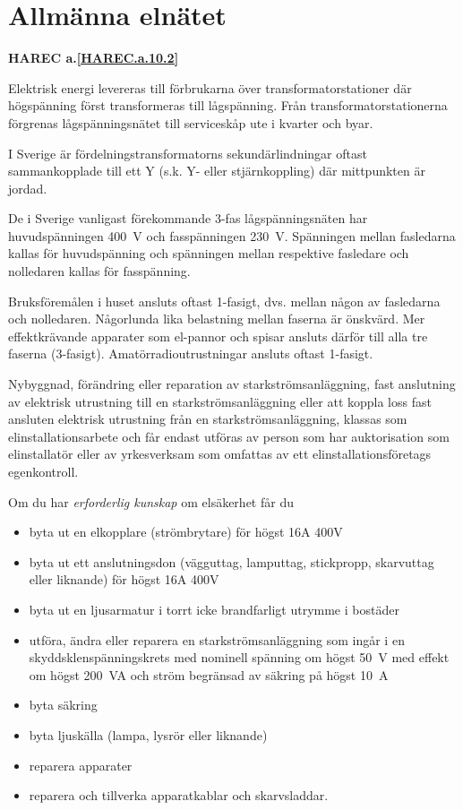 \section{Allmänna elnätet}
\textbf{
HAREC a.\ref{HAREC.a.10.2}\label{myHAREC.a.10.2}
}
\label{jordning}

Elektrisk energi levereras till förbrukarna över transformatorstationer där
högspänning först transformeras till lågspänning.
Från transformatorstationerna förgrenas lågspänningsnätet till serviceskåp ute
i kvarter och byar.

I Sverige är fördelningstransformatorns sekundärlindningar oftast sammankopplade
till ett Y (s.k. Y- eller stjärnkoppling) där mittpunkten är jordad.

De i Sverige vanligast förekommande 3-fas lågspänningsnäten har huvudspänningen
400~V och fasspänningen 230~V.
Spänningen mellan fasledarna kallas för huvudspänning och spänningen mellan
respektive fasledare och nolledaren kallas för fasspänning.

Bruksföremålen i huset ansluts oftast 1-fasigt, dvs. mellan någon av
fasledarna och nolledaren.
Någorlunda lika belastning mellan faserna är önskvärd.
Mer effektkrävande apparater som el-pannor och spisar ansluts därför till alla
tre faserna (3-fasigt).
Amatörradioutrustningar ansluts oftast 1-fasigt.

Nybyggnad, förändring eller reparation av starkströmsanläggning,
fast anslutning av elektrisk utrustning till en starkströmsanläggning
eller att koppla loss fast ansluten elektrisk utrustning från en
starkströmsanläggning, klassas som elinstallationsarbete och får endast
utföras av person som har auktorisation som elinstallatör eller av
yrkesverksam som omfattas av ett elinstallationsföretags egenkontroll.

Om du har \emph{erforderlig kunskap} om elsäkerhet får du
\begin{itemize}
\item byta ut en elkopplare (strömbrytare) för högst 16A 400V
\item byta ut ett anslutningsdon (vägguttag, lamputtag, stickpropp,
skarvuttag eller liknande) för högst 16A 400V
\item byta ut en ljusarmatur i torrt icke brandfarligt utrymme i bostäder
\item utföra, ändra eller reparera en starkströmsanläggning som ingår i en
skyddsklenspänningskrets med nominell spänning om högst 50~V med effekt om
högst 200~VA och ström begränsad av säkring på högst 10~A
\item byta säkring
\item byta ljuskälla (lampa, lysrör eller liknande)
\item reparera apparater
\item reparera och tillverka apparatkablar och skarvsladdar.
\end{itemize}

